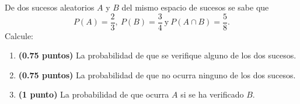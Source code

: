 
De dos sucesos aleatorios $A$ y $B$ del mismo espacio de sucesos se sabe que
\[
P(A)=\frac{2}{3},\ P(B)=\frac{3}{4}\ \text{y}\ P(A\cap B)=\frac{5}{8}.
\]
Calcule:
\begin{enumerate}[label=\alph*)]
\item \textbf{(0.75 puntos)} La probabilidad de que se verifique alguno de los dos sucesos.
\item \textbf{(0.75 puntos)} La probabilidad de que no ocurra ninguno de los dos sucesos.
\item \textbf{(1 punto)} La probabilidad de que ocurra $A$ si se ha verificado $B$.
\end{enumerate}
